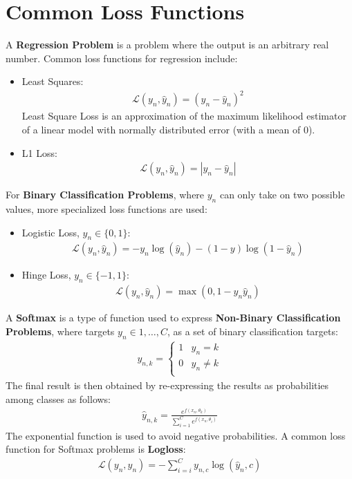 \documentclass{report}
\newcommand{\tbf}{\textbf}
\newcommand{\loss}{\mathcal{L}}
\newcommand{\yhat}{\hat{y}}
\begin{document}
\section{Common Loss Functions}
A \tbf{Regression Problem} is a problem where the output is an arbitrary real number. Common loss functions for regression include:
\begin{itemize}
 \item Least Squares:
 \begin{align*}
  \loss(y_n, \yhat_n) = (y_n - \yhat_n)^2
 \end{align*}
 Least Square Loss is an approximation of the maximum likelihood estimator of a linear model with normally distributed error (with a mean of 0).
 \item L1 Loss:
 \begin{align*}
  \loss(y_n, \yhat_n) = |y_n - \yhat_n|
 \end{align*}
\end{itemize}
For \tbf{Binary Classification Problems}, where $y_n$ can only take on two possible values, more specialized loss functions are used:
\begin{itemize}
 \item Logistic Loss, $y_n \in \{0,1\}$:
 \begin{align*}
  \loss(y_n, \yhat_n) = -y_n \log(\yhat_n) - (1-y) \log (1-\yhat_n)
 \end{align*}
 \item Hinge Loss, $y_n \in \{-1,1\}$:
 \begin{align*}
  \loss(y_n, \yhat_n) = \max(0,1-y_n\yhat_n)
 \end{align*}
\end{itemize}
A \tbf{Softmax} is a type of function used to express \tbf{Non-Binary Classification Problems}, where targets $y_n \in {1, \hdots, C}$, as a set of binary classification targets:
\begin{align*}
 y_{n,k} = 
\begin{cases}
1 & y_n = k\\
0 & y_n \neq k\\
\end{cases}
\end{align*}
The final result is then obtained by re-expressing the results as probabilities among classes as follows:
\begin{align*}
 \yhat_{n,k} = \frac{e^{f(x_n, \theta_k)}}{\sum_{i=1}^{C}e^{f(x_n, \theta_i)}}
\end{align*}
The exponential function is used to avoid negative probabilities. A common loss function for Softmax problems is \tbf{Logloss}:
\begin{align*}
 \loss(y_n, \yhat_n) = -\sum_{i=i}^{C} y_{n,c} \log(\yhat_n,c)
\end{align*}
%
\end{document}
